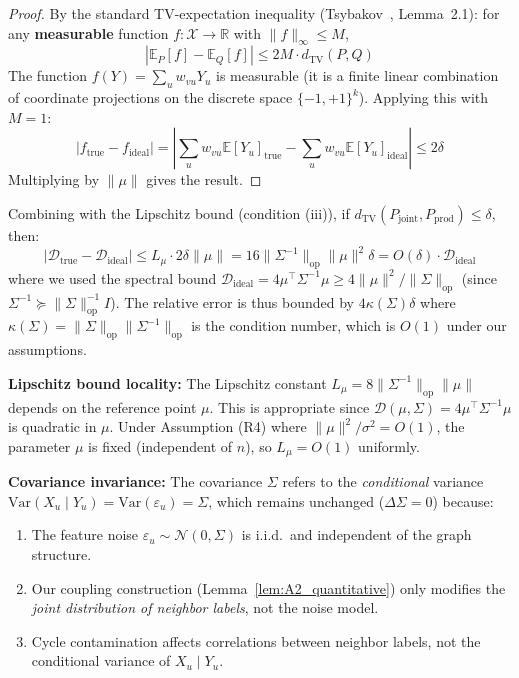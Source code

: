 \begin{remark}
\begin{proof}
By the standard TV-expectation inequality (Tsybakov~\cite{tsybakov2009introduction}, Lemma~2.1): for any \textbf{measurable} function $f: \mathcal{X} \to \mathbb{R}$ with $\|f\|_\infty \leq M$,
\begin{equation}
    |\mathbb{E}_{P}[f] - \mathbb{E}_{Q}[f]| \leq 2M \cdot d_{\mathrm{TV}}(P, Q)
\end{equation}
The function $f(Y) = \sum_u w_{vu} Y_u$ is measurable (it is a finite linear combination of coordinate projections on the discrete space $\{-1,+1\}^k$).
Applying this with $M = 1$:
\begin{equation}
    |f_{\mathrm{true}} - f_{\mathrm{ideal}}| = \left|\sum_u w_{vu} \mathbb{E}[Y_u]_{\mathrm{true}} - \sum_u w_{vu} \mathbb{E}[Y_u]_{\mathrm{ideal}}\right| \leq 2\delta
\end{equation}
Multiplying by $\|\mu\|$ gives the result.
\end{proof}

Combining with the Lipschitz bound (condition (iii)), if $d_{\mathrm{TV}}(P_{\mathrm{joint}}, P_{\mathrm{prod}}) \leq \delta$, then:
\begin{equation}
    |\mathcal{D}_{\mathrm{true}} - \mathcal{D}_{\mathrm{ideal}}| \leq L_\mu \cdot 2\delta \|\mu\| = 16\|\Sigma^{-1}\|_{\mathrm{op}} \|\mu\|^2 \delta = O(\delta) \cdot \mathcal{D}_{\mathrm{ideal}}
\end{equation}
where we used the spectral bound $\mathcal{D}_{\mathrm{ideal}} = 4\mu^\top \Sigma^{-1} \mu \geq 4\|\mu\|^2 / \|\Sigma\|_{\mathrm{op}}$ (since $\Sigma^{-1} \succeq \|\Sigma\|_{\mathrm{op}}^{-1} I$). The relative error is thus bounded by $4\kappa(\Sigma) \delta$ where $\kappa(\Sigma) = \|\Sigma\|_{\mathrm{op}} \|\Sigma^{-1}\|_{\mathrm{op}}$ is the condition number, which is $O(1)$ under our assumptions.

\textbf{Lipschitz bound locality:} The Lipschitz constant $L_\mu = 8\|\Sigma^{-1}\|_{\mathrm{op}} \|\mu\|$ depends on the reference point $\mu$. This is appropriate since $\mathcal{D}(\mu, \Sigma) = 4\mu^\top \Sigma^{-1} \mu$ is quadratic in $\mu$. Under Assumption (R4) where $\|\mu\|^2/\sigma^2 = O(1)$, the parameter $\mu$ is fixed (independent of $n$), so $L_\mu = O(1)$ uniformly.

\textbf{Covariance invariance:} The covariance $\Sigma$ refers to the \textit{conditional} variance $\mathrm{Var}(X_u \mid Y_u) = \mathrm{Var}(\varepsilon_u) = \Sigma$, which remains unchanged ($\Delta\Sigma = 0$) because:
\begin{enumerate}
    \item The feature noise $\varepsilon_u \sim \mathcal{N}(0, \Sigma)$ is i.i.d.\ and independent of the graph structure.
    \item Our coupling construction (Lemma~\ref{lem:A2_quantitative}) only modifies the \textit{joint distribution of neighbor labels}, not the noise model.
    \item Cycle contamination affects correlations between neighbor labels, not the conditional variance of $X_u \mid Y_u$.
\end{enumerate}


\end{remark}
